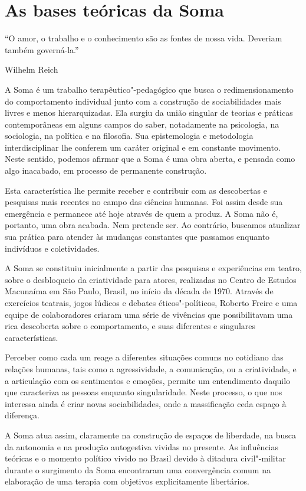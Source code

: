 \chapter*{As bases teóricas da Soma}

\epigraph{``O amor, o trabalho e o conhecimento são as fontes de nossa vida.
Deveriam também governá-la.''}{Wilhelm Reich}

A Soma é um trabalho terapêutico"-pedagógico que busca o
redimensionamento do comportamento individual junto com a construção de
sociabilidades mais livres e menos hierarquizadas. Ela surgiu da união
singular de teorias e práticas contemporâneas em alguns campos do saber,
notadamente na psicologia, na sociologia, na política e na filosofia.
Sua epistemologia e metodologia interdisciplinar lhe conferem um caráter
original e em constante movimento. Neste sentido, podemos afirmar que a
Soma é uma obra aberta, e pensada como algo inacabado, em processo de
permanente construção.

Esta característica lhe permite receber e contribuir com as descobertas
e pesquisas mais recentes no campo das ciências humanas. Foi assim desde
sua emergência e permanece até hoje através de quem a produz. A Soma não
é, portanto, uma obra acabada. Nem pretende ser. Ao contrário, buscamos
atualizar sua prática para atender às mudanças constantes que passamos
enquanto indivíduos e coletividades.

A Soma se constituiu inicialmente a partir das pesquisas e experiências
em teatro, sobre o desbloqueio da criatividade para atores, realizadas
no Centro de Estudos Macunaíma em São Paulo, Brasil, no início da década
de 1970. Através de exercícios teatrais, jogos lúdicos e debates
éticos"-políticos, Roberto Freire e uma equipe de colaboradores criaram
uma série de vivências que possibilitavam uma rica descoberta sobre o
comportamento, e suas diferentes e singulares características.

Perceber como cada um reage a diferentes situações comuns no cotidiano
das relações humanas, tais como a agressividade, a comunicação, ou a
criatividade, e a articulação com os sentimentos e emoções, permite um
entendimento daquilo que caracteriza as pessoas enquanto singularidade.
Neste processo, o que nos interessa ainda é criar novas sociabilidades,
onde a massificação ceda espaço à diferença.

A Soma atua assim, claramente na construção de espaços de liberdade, na
busca da autonomia e na produção autogestiva vividas no presente. As
influências teóricas e o momento político vivido no Brasil devido à
ditadura civil"-militar durante o surgimento da Soma encontraram uma
convergência comum na elaboração de uma terapia com objetivos
explicitamente libertários.

